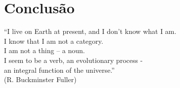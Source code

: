 \chapter{Conclusão}
\label{cap:coclusion}

\begin{flushright}
    ``I live on Earth at present, and I don’t know what I am. \\
    I know that I am not a category. \\
    I am not a thing -- a noun.\\ 
    I seem to be a verb, an evolutionary process -\\
    an integral function of the universe.''\\ 
    (R. Buckminster Fuller)
    \end{flushright}